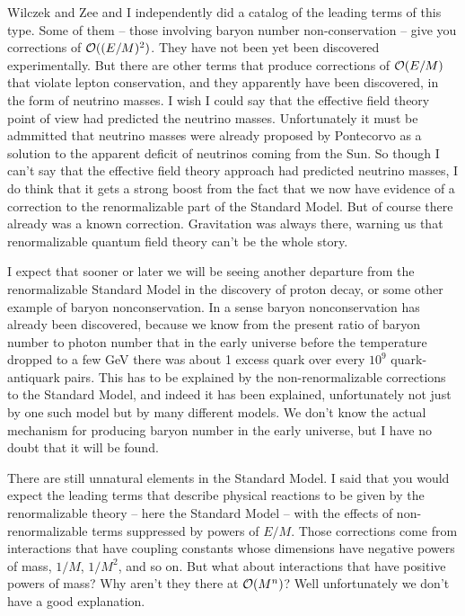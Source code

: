 \documentclass[12pt]{article}
\begin{document}
Wilczek and Zee and I independently did a catalog of the leading terms of this type. Some of them -- those involving baryon number non-conservation -- give you corrections of ${\cal O}((E/M)^2)$. They have not been yet been discovered experimentally. But there are other terms that produce corrections of ${\cal O}(E/M)$ that violate lepton conservation, and they apparently have been discovered, in the form of neutrino masses. I wish I could say that the effective field theory point of view had predicted the neutrino masses. Unfortunately it must be admmitted that neutrino masses were already proposed by Pontecorvo as a solution to the apparent deficit of neutrinos coming from the Sun. So though I can't say that the effective field theory approach had predicted neutrino masses,  I do think  that it gets a strong boost from the fact that we now  have evidence of a correction to the renormalizable part of the Standard Model. But  of course there already was a known correction.  
Gravitation was always there, warning us that renormalizable quantum field theory can't be the whole story. 

I expect that sooner or later we will be seeing another departure from the renormalizable Standard Model in the discovery of proton decay, or some other example of  baryon nonconservation. In a sense baryon nonconservation has already been discovered, because we know from the present ratio of baryon number to photon number that in the early universe before the temperature dropped to a few GeV there was about 1 excess quark over every $10^9$ quark-antiquark pairs.  This has to be explained by the non-renormalizable corrections to the Standard Model, and indeed it has been explained, unfortunately not just by one such model but by many different models.  We don't know the actual mechanism for producing baryon number in the early universe, but I have no doubt that it will be found.

 There are still unnatural elements in the Standard Model. I said that you would expect the leading terms that describe physical reactions to be given by the renormalizable theory -- here the Standard Model -- with the effects  of  non-renormalizable terms suppressed by powers of $E/M$. Those corrections come from interactions that have coupling constants whose dimensions have negative powers of mass, $1/M$, $1/M^2$, and so on. But what about interactions that have positive powers of mass? Why aren't they there at ${\cal O}(M^n)$? Well unfortunately we don't have a good explanation. 
\end{document}
